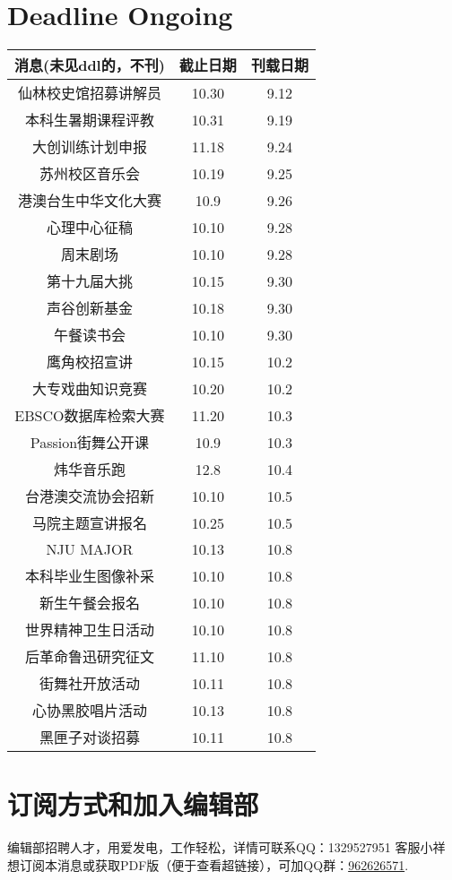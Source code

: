 \documentclass[letterpaper, 12pt]{article}
\begin{document}
\begin{multicols}{2}

\section{Deadline Ongoing}
\begin{tabular}{|c|c|c|}
    \hline
    消息(未见ddl的，不刊) & 截止日期 & 刊载日期\\
    \hline\hline
    仙林校史馆招募讲解员 & 10.30 & 9.12\\
    本科生暑期课程评教 & 10.31 & 9.19\\
    大创训练计划申报 & 11.18 & 9.24\\
    苏州校区音乐会 & 10.19 & 9.25\\
    港澳台生中华文化大赛 & 10.9 & 9.26\\
    心理中心征稿 & 10.10 & 9.28\\
    周末剧场 & 10.10 & 9.28\\
    第十九届大挑 & 10.15 & 9.30\\
    声谷创新基金 & 10.18 & 9.30\\
    午餐读书会 & 10.10 & 9.30\\
    鹰角校招宣讲 & 10.15 & 10.2\\
    大专戏曲知识竞赛 & 10.20 & 10.2\\
    EBSCO数据库检索大赛 & 11.20 & 10.3\\
    Passion街舞公开课 & 10.9 & 10.3\\
    炜华音乐跑 & 12.8 & 10.4\\
    台港澳交流协会招新 & 10.10 & 10.5\\
    马院主题宣讲报名 & 10.25 & 10.5\\
    NJU MAJOR & 10.13 & 10.8\\
    本科毕业生图像补采 & 10.10 & 10.8\\
    新生午餐会报名 & 10.10 & 10.8\\
    世界精神卫生日活动 & 10.10 & 10.8\\
    后革命鲁迅研究征文 & 11.10 & 10.8\\
    街舞社开放活动 & 10.11 & 10.8\\
    心协黑胶唱片活动 & 10.13 & 10.8\\
    黑匣子对谈招募 & 10.11 & 10.8\\
    \hline
\end{tabular}
\section{订阅方式和加入编辑部}
编辑部招聘人才，用爱发电，工作轻松，详情可联系QQ：1329527951 客服小祥\\想订阅本消息或获取PDF版（便于查看超链接），可加QQ群：\href{https://qm.qq.com/q/FGX1VYCrGS}{962626571}.

\end{multicols}
\end{document}
